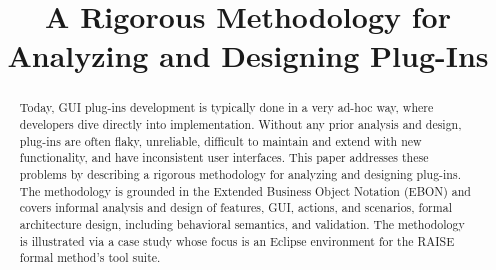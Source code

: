 \documentclass[letterpaper,conference]{IEEEtran}
\begin{document}
%
\title{A Rigorous Methodology for Analyzing and Designing Plug-Ins}


\author{

\and


\and

}



\maketitle
\pagestyle{empty}
\thispagestyle{empty}


\begin{abstract}
  Today, GUI plug-ins development is typically done in a very ad-hoc
  way, where developers dive directly into implementation.  Without
  any prior analysis and design, plug-ins are often flaky, unreliable,
  difficult to maintain and extend with new functionality, and have
  inconsistent user interfaces.  This paper addresses these problems
  by describing a rigorous methodology for analyzing and designing
  plug-ins.  The methodology is grounded in the Extended Business
  Object Notation (EBON) and covers informal analysis and design of
  features, GUI, actions, and scenarios, formal architecture design,
  including behavioral semantics, and validation.  The methodology is
  illustrated via a case study whose focus is an Eclipse environment
  for the RAISE formal method's tool suite.
\end{abstract}
\end{document}
